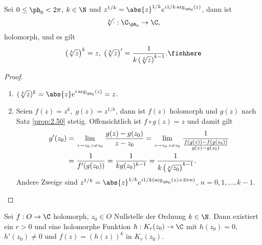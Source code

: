 \begin{prop}
\label{prop:2.51}
Sei $0\le\ph_0<2\pi$, $k\in\N$ und $z^{1/k} =
\abs{z}^{1/k}e^{i1/k\arg_{\ph_0}(z)}$, dann ist
\begin{align*}
\sqrt[k]{\cdot}: \C_{\ph_0} \to \C, 
\end{align*}
holomorph, und es gilt
\begin{align*}
\left(\sqrt[k]{z}\right)^k  = z,\;\left(\sqrt[k]{z}\right)' =
\frac{1}{k\left(\sqrt[k]{z}\right)^{k-1}}.\fishhere
\end{align*}
\end{prop}
\begin{proof}
\begin{enumerate}
  \item $(\sqrt[k]{z})^k = \abs{z} e^{i\arg_{\ph_0}(z)} = z$.
  \item Seien $f(z) = z^k,\;g(z) = z^{1/k}$, dann ist $f(z)$ holomorph und
  $g(z)$ nach Satz \ref{prop:2.50} stetig. Offensichtlich ist $f\circ g (z) =
  z$ und damit gilt
  \begin{align*}
  g'(z_0) &= \lim\limits_{\atop{z\to z_0,}{z\neq z_0}} \frac{g(z)-g(z_0)}{z-z_0}
  = \lim\limits_{\atop{z\to z_0,}{z\neq z_0}}
  \frac{1}{\frac{f(g(z))-f(g(z_0))}{g(z)-g(z_0)}} \\ &= \frac{1}{f'(g(z_0))} =
  \frac{1}{k g(z_0)^{k-1}} = \frac{1}{k\left(\sqrt[k]{z_0}\right)^{k-1}}.
  \end{align*}
Andere Zweige sind $z^{1/k} = \abs{z}^{1/k}e^{i1/k(\arg_{\ph_0}(z)+2\pi n)}$,
$n= 0,1, \ldots,k-1$.\qedhere
\end{enumerate}
\end{proof}

\begin{prop}
\label{prop:2.52}
Sei $f:O\to\C$ holomorph, $z_0\in O$ Nullstelle der Ordnung $k\in\N$.
Dann existiert ein $r> 0$ und eine holomorphe Funktion $h: K_r(z_0)\to\C$
mit $h(z_0)=0$, $h'(z_0)\neq 0$ und $f(z) = \left(h(z)\right)^k$ in
$K_r(z_0)$.\fishhere
\end{prop}

